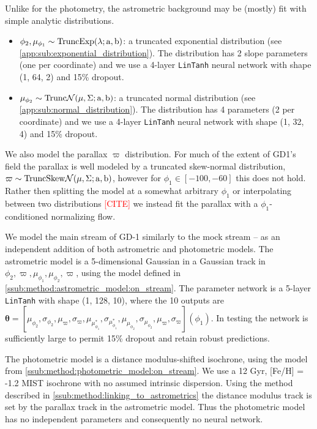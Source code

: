\documentclass[twocolumn]{aastex631}
\newcommand{\stream}[1]{#1}
\newcommand{\mbs}[1]{\boldsymbol{#1}}
\newcommand{\mcal}[1]{\mathcal{#1}}
\newcommand{\parallax}{\varpi}
\newcommand{\TODO}[1]{{\textcolor{red}{#1}}}
\begin{document}
        Unlike for the photometry, the astrometric background may be (mostly) fit with simple analytic distributions.
        \begin{itemize}
            \item $\phi_2, \mu_{\phi_1} \sim \rm{TruncExp}(\lambda; a, b)$:
                a truncated exponential distribution (see \autoref{app:sub:exponential_distribution}). 
                The distribution has 2 slope parameters (one per coordinate) and we use a 4-layer 
                \texttt{LinTanh} neural network with shape (1, 64, 2) and 15\% dropout.
            \item $\mu_{\phi_2} \sim \rm{Trunc}\mcal{N}(\mu, \Sigma; a, b)$:
                a truncated normal distribution (see \autoref{app:sub:normal_distribution}).
                The distribution has 4 parameters (2 per coordinate) and we use a 4-layer 
                \texttt{LinTanh} neural network with shape (1, 32, 4) and 15\% dropout.
        \end{itemize}
        We also model the parallax $\parallax$ distribution. For much of the extent of
        \stream{GD1's} field the parallax is well modeled by a truncated skew-normal
        distribution, $\parallax \sim \rm{TruncSkew}\mcal{N}(\mu, \Sigma; a, b)$, however for
        $\phi_1 \in [-100, -60]$ this does not hold. Rather then splitting the model at a
        somewhat arbitrary $\phi_1$ or interpolating between two distributions \TODO{[CITE]}
        we instead fit the parallax with a $\phi_1$-conditioned normalizing flow.

        We model the main stream of \stream{GD-1} similarly to the mock stream --
        as an independent addition of both astrometric and photometric models.
        The astrometric model is a 5-dimensional Gaussian in
        a Gaussian track in $\phi_2, \parallax, \mu_{\phi_1}, \mu_{\phi_2}, \parallax$,
        using the model defined in \autoref{ssub:method:astrometric_model:on_stream}.
        The parameter network is a 5-layer \texttt{LinTanh} with shape (1, 128, 10),
        where the 10 outputs are
        $\mbs{\theta} = [\mu_{\phi_2}, \sigma_{\phi_2}, \mu_\parallax, \sigma_\parallax, \mu_{\mu_{\phi_1}^*},
        \sigma_{\mu_{\phi_1}^*}, \mu_{\mu_{\phi_2}},
        \sigma_{\mu_{\phi_2}}, \mu_\parallax, \sigma_\parallax](\phi_1)$.
        In testing the network is sufficiently
        large to permit 15\% dropout and retain robust predictions.

        The photometric model is a distance modulus-shifted isochrone, using the
        model from \autoref{ssub:method:photometric_model:on_stream}.
        We use a 12 Gyr, [Fe/H] = -1.2 MIST isochrone with no assumed intrinsic dispersion.
        Using the method described in \autoref{ssub:method:linking_to_astrometrics}
        the distance modulus track is set by the parallax track in the astrometric model. Thus the photometric model has no independent parameters and consequently no neural network.
\end{document}

